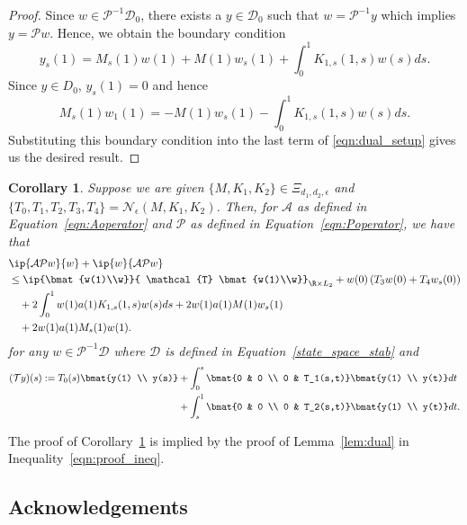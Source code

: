 \documentclass[9pt,journal,twocolumn]{IEEEtran}
\newtheorem{corollary}{Corollary}
\newcommand{\igzo}{\int_0^1}
\newcommand{\igzs}{\int_0^s}
\newcommand{\igso}{\int_s^1}
\begin{document}
\begin{proof}
Since $w \in \mathcal{P}^{-1}\mathcal{D}_0$, there exists a $y \in \mathcal{D}_0$ such that $w=\mathcal{P}^{-1}y$ which implies $y=\mathcal{P}w$. Hence, we obtain the boundary condition
\[y_s(1)=M_s(1)w(1)+M(1)w_s(1)+\igzo K_{1,s}(1,s)w(s)ds.\]
Since $y \in D_0$, $y_s(1)=0$ and hence
\[
M_s(1)w_1(1)=-M(1)w_s(1)-\igzo K_{1,s}(1,s)w(s)ds.
\]
Substituting this boundary condition into the last term of \eqref{eqn:dual_setup} gives us the desired result.
\end{proof}


\begin{corollary}\label{cor:dual2}
Suppose we are given  $\{M,K_1,K_2\} \in \Xi_{d_1,d_2,\epsilon}$ and $\{T_0,T_1,T_2,T_3,T_4\}=\mathcal{N}_\epsilon(M,K_1,K_2)$. Then, for $\mathcal{A}$ as defined in Equation~\eqref{eqn:Aoperator} and $\mathcal{P}$ as defined in Equation~\eqref{eqn:Poperator}, we have that
\begin{align}
&\ip{\mathcal{A}\mathcal{P}w}{w}+\ip{w}{\mathcal{A}\mathcal{P}w} \\
&\le  \ip{\bmat{w(1)\\w}}{ \mathcal{T} \bmat{w(1)\\w}}_{\R \times L_2}+w(0)\left(T_3 w(0) + T_4 w_s(0) \right) \nonumber \\
&\quad+ 2 \igzo w(1)a(1)K_{1,s}(1,s)w(s)ds+ 2w(1)a(1)M(1)w_s(1) \nonumber \\
&\label{eqn:dual_setup}\quad+2w(1)a(1)M_s(1)w(1).
\end{align}
for any $w \in \mathcal{P}^{-1}\mathcal{D}$ where $\mathcal{D}$ is defined in Equation~\eqref{state_space_stab} and
\begin{align*}
(\mathcal{T}y)(s) :=  T_0(s)\bmat{y(1) \\ y(s)} &+   \igzs  \bmat{0 & 0 \\ 0 & T_1(s,t)} \bmat{y(1) \\ y(t)} dt \\
& + \igso  \bmat{0 & 0 \\ 0 & T_2(s,t)} \bmat{y(1) \\ y(t)} dt.
\end{align*}
\end{corollary}
The proof of Corollary~\ref{cor:dual2} is implied by the proof of Lemma~\ref{lem:dual} in Inequality~\eqref{eqn:proof_ineq}.


\subsection{Acknowledgements}
\end{document}
